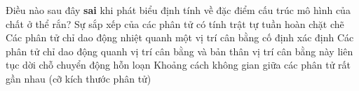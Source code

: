 \begin{ex}	Điều nào sau đây \textbf{sai} khi phát biểu định tính về đặc điểm cấu trúc mô hình của chất ở thể rắn?
	\choice
	{Sự sắp xếp của các phân tử có tính trật tự tuần hoàn chặt chẽ}
	{Các phân tử chỉ dao động nhiệt quanh một vị trí cân bằng cố định xác định}
	{\True Các phân tử chỉ dao động quanh vị trí cân bằng và bản thân vị trí cân bằng này liên tục dời chỗ chuyển động hỗn loạn}
	{Khoảng cách không gian giữa các phân tử rất gần nhau (cỡ kích thước phân tử)}
\end{ex}

